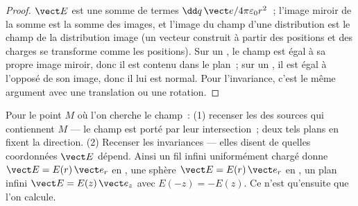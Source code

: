 \begin{proof}
$\vect E$ est une somme de termes $\dd q\,\vect e/4\pi\varepsilon_0r^2$~; l'image
miroir de la somme est la somme des images, et l'image du champ d'une
distribution est le champ de la distribution image (un vecteur construit à
partir des positions et des charges se transforme comme les positions). Sur un
, le champ est égal à sa propre image miroir, donc il est
contenu dans le plan~; sur un , il est égal à l'opposé de
son image, donc il lui est normal. Pour l'invariance, c'est le même argument
avec une translation ou une rotation.
\end{proof}

\begin{method}\label{meth:b1:electrostatics-gauss:symmetry}
Pour le point $M$ où l'on cherche le champ~: (1) recenser les  des sources qui contiennent $M$ --- le champ est porté par leur
intersection~; deux tels plans en fixent la direction. (2) Recenser les
invariances --- elles disent de quelles coordonnées $\vect E$ dépend. Ainsi un
fil infini uniformément chargé donne $\vect E = E(r)\,\vect e_r$ en
, une sphère $\vect E = E(r)\,\vect e_r$ en
, un plan infini $\vect E = E(z)\,\vect e_z$ avec
$E(-z) = -E(z)$. Ce n'est qu'ensuite que l'on calcule.
\end{method}

